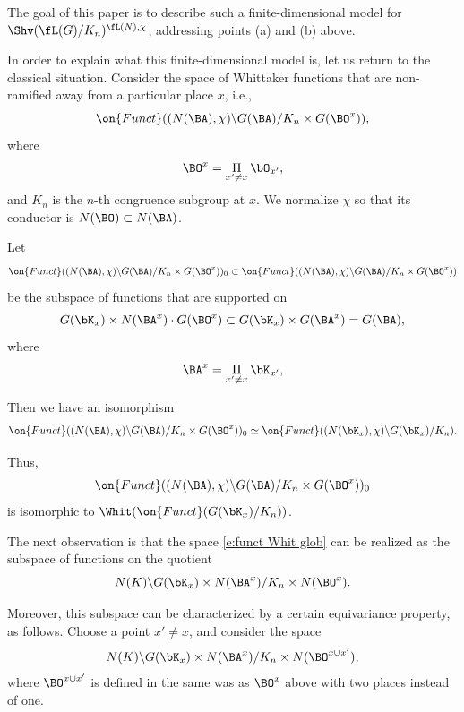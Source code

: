 \documentclass[9pt]{amsart}
\theoremstyle{definition}
\theoremstyle{remark}
\numberwithin{equation}{section}
\begin{document}
\medskip

The goal of this paper is to describe such a finite-dimensional model for $\Shv(\fL(G)/K_n)^{\fL(N),\chi}$,
addressing  points (a) and (b) above. 

\sssec{}

In order to explain what this finite-dimensional model is, let us return to the classical situation.
Consider the space of Whittaker functions that are non-ramified away from a particular place $x$, i.e.,
$$\on{Funct}((N(\BA),\chi)\backslash G(\BA)/K_n\times G(\BO^x)),$$
where
$$\BO^x=\underset{x'\neq x}\Pi\, \bO_{x'},$$
and $K_n$ is the $n$-th congruence subgroup at $x$. We normalize $\chi$ so that its conductor is $N(\BO)\subset N(\BA)$.

\medskip

Let
$$\on{Funct}((N(\BA),\chi)\backslash G(\BA)/K_n\times G(\BO^x))_0\subset \on{Funct}((N(\BA),\chi)\backslash G(\BA)/K_n\times G(\BO^x))$$
be the subspace of functions that are supported on 
$$G(\bK_x)\times N(\BA^x)\cdot G(\BO^x) \subset 
G(\bK_x)\times G(\BA^x)=G(\BA),$$
where 
$$\BA^x=\underset{x'\neq x}\Pi\, \bK_{x'},$$

Then we have an isomorphism 
\begin{equation} \label{e:funct loc to glob}
\on{Funct}((N(\BA),\chi)\backslash G(\BA)/K_n\times G(\BO^x))_0\simeq \on{Funct}((N(\bK_x),\chi)\backslash G(\bK_x)/K_n).
\end{equation}

\medskip

Thus, 
\begin{equation} \label{e:funct Whit glob}
\on{Funct}((N(\BA),\chi)\backslash G(\BA)/K_n\times G(\BO^x))_0
\end{equation}
is isomorphic to $\Whit(\on{Funct}(G(\bK_x)/K_n))$.

\sssec{}  \label{sss:glob Whit recipe}

The next observation is that the space \eqref{e:funct Whit glob} can be realized as the subspace of
functions on the quotient
\begin{equation} \label{e:N glob quo}
N(K)\backslash G(\bK_x) \times N(\BA^x)/K_n\times N(\BO^x).
\end{equation}

Moreover, this subspace can be characterized by a certain equivariance property, as follows. Choose a point $x'\neq x$, and consider the space
\begin{equation} \label{e:N glob quo prime}
N(K)\backslash G(\bK_x) \times N(\BA^x)/K_n\times N(\BO^{x\cup x'}),
\end{equation}
where $\BO^{x\cup x'}$ is defined in the same was as $\BO^x$ above with two places instead of one.
\end{document}
